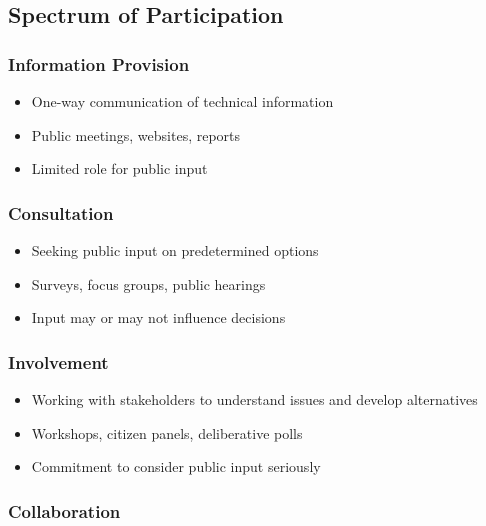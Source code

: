 \documentclass[
  letterpaper,
  DIV=11,
  numbers=noendperiod]{scrreprt}
\providecommand{\tightlist}{%
  \setlength{\itemsep}{0pt}\setlength{\parskip}{0pt}}
\begin{document}
\subsection{Spectrum of Participation}\label{spectrum-of-participation}

\subsubsection{Information Provision}\label{information-provision}

\begin{itemize}
\tightlist
\item
  One-way communication of technical information
\item
  Public meetings, websites, reports
\item
  Limited role for public input
\end{itemize}

\subsubsection{Consultation}\label{consultation}

\begin{itemize}
\tightlist
\item
  Seeking public input on predetermined options
\item
  Surveys, focus groups, public hearings
\item
  Input may or may not influence decisions
\end{itemize}

\subsubsection{Involvement}\label{involvement}

\begin{itemize}
\tightlist
\item
  Working with stakeholders to understand issues and develop
  alternatives
\item
  Workshops, citizen panels, deliberative polls
\item
  Commitment to consider public input seriously
\end{itemize}

\subsubsection{Collaboration}\label{collaboration}
\end{document}
